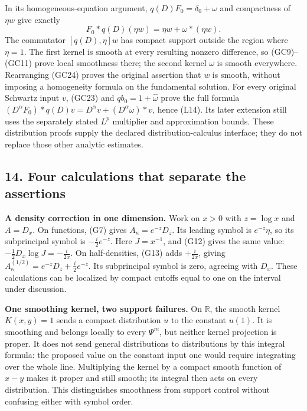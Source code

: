 \documentclass[
  11pt,
]{article}
\begin{document}
In its homogeneous-equation argument, \(q(D)F_0=\delta_0+\omega\) and
compactness of \(\eta w\) give exactly \[
 F_0*q(D)(\eta w)
       =\eta w+\omega*(\eta w).
 \tag{GC24}
\] The commutator \([q(D),\eta]w\) has compact support outside the
region where \(\eta=1\). The first kernel is smooth at every resulting
nonzero difference, so (GC9)--(GC11) prove local smoothness there; the
second kernel \(\omega\) is smooth everywhere. Rearranging (GC24) proves
the original assertion that \(w\) is smooth, without imposing a
homogeneity formula on the fundamental solution. For every original
Schwartz input \(v\), (GC23) and \(q b_0=1+\widehat\omega\) prove the
full formula \((D^\alpha F_0)*q(D)v=D^\alpha v+(D^\alpha\omega)*v\),
hence (L14). Its later extension still uses the separately stated
\(L^p\) multiplier and approximation bounds. These distribution proofs
supply the declared distribution-calculus interface; they do not replace
those other analytic estimates.

\subsection{14. Four calculations that separate the
assertions}\label{four-calculations-that-separate-the-assertions}

\textbf{A density correction in one dimension.} Work on \(x>0\) with
\(z=\log x\) and \(A=D_x\). On functions, (G7) gives
\(A_\kappa=e^{-z}D_z\). Its leading symbol is \(e^{-z}\eta\), so its
subprincipal symbol is \(-\frac i2e^{-z}\). Here \(J=x^{-1}\), and (G12)
gives the same value: \(-\frac12D_x\log J=-\frac i{2x}\). On
half-densities, (G13) adds \(+\frac i{2x}\), giving
\(A^{(1/2)}_\kappa=e^{-z}D_z+\frac i2e^{-z}\). Its subprincipal symbol
is zero, agreeing with \(D_x\). These calculations can be localized by
compact cutoffs equal to one on the interval under discussion.

\textbf{One smoothing kernel, two support failures.} On \(\mathbb R\),
the smooth kernel \(K(x,y)=1\) sends a compact distribution \(u\) to the
constant \(u(1)\). It is smoothing and belongs locally to every
\(\Psi^m\), but neither kernel projection is proper. It does not send
general distributions to distributions by this integral formula: the
proposed value on the constant input one would require integrating over
the whole line. Multiplying the kernel by a compact smooth function of
\(x-y\) makes it proper and still smooth; its integral then acts on
every distribution. This distinguishes smoothness from support control
without confusing either with symbol order.
\end{document}
